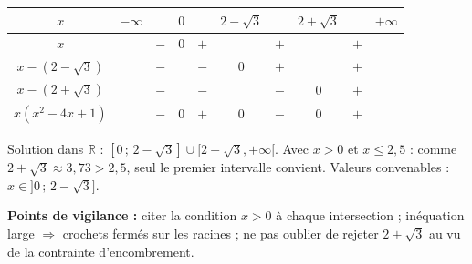 \documentclass[11pt]{article}
\begin{document}
\begin{corrige}
\begin{enumerate}
\begin{center}
\begin{tabular}{|c|ccccccccc|}\hline
$x$ & $-\infty$ &  & $0$ &  & $2-\sqrt{3}$ &  & $2+\sqrt{3}$ &  & $+\infty$ \\\hline
$x$ &  & $-$ & $0$ & $+$ &  & $+$ &  & $+$ &  \\
$x-(2-\sqrt{3})$ &  & $-$ &  & $-$ & $0$ & $+$ &  & $+$ &  \\
$x-(2+\sqrt{3})$ &  & $-$ &  & $-$ &  & $-$ & $0$ & $+$ &  \\\hline
$x(x^2-4x+1)$ &  & $-$ & $0$ & $+$ & $0$ & $-$ & $0$ & $+$ &  \\\hline
\end{tabular}
\end{center}
Solution dans $\mathbb{R}$ : $[0\,;\,2-\sqrt{3}]\cup[2+\sqrt{3},+\infty[$.
Avec $x>0$ et $x\le 2{,}5$ : comme $2+\sqrt{3}\approx 3{,}73>2{,}5$, seul le premier intervalle convient. Valeurs convenables : $x\in ]0\,;\,2-\sqrt{3}]$.
\end{enumerate}
\textbf{Points de vigilance :} citer la condition $x>0$ à chaque intersection ; inéquation large $\Rightarrow$ crochets fermés sur les racines ; ne pas oublier de rejeter $2+\sqrt{3}$ au vu de la contrainte d'encombrement.
\end{corrige}
\end{document}
